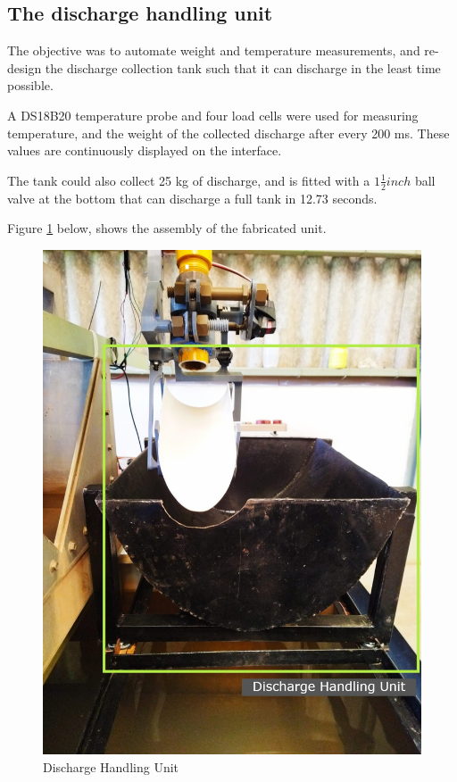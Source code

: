 \subsection{The discharge handling unit}
The objective was to automate weight and temperature measurements, and re-design the discharge collection tank such that it can discharge in the least time possible. 
\par 
A DS18B20 temperature probe and four load cells were used for measuring temperature, and the weight of the collected discharge after every 200 ms. These values are continuously displayed on the interface. 
\par
The tank could also collect 25 kg of discharge, and is fitted with a $1 \frac{1}{2} inch$ ball valve at the bottom that can discharge a full tank in 12.73 seconds.
\par
Figure \ref{fig: Discharge Handling Unit} below, shows the assembly of the fabricated unit. 
\begin{figure}[H]
\centering
\includegraphics[height=.5\textheight]{Figures/discharge handling results.jpg}
\caption{Discharge Handling Unit}
\label{fig: Discharge Handling Unit}
\end{figure}

